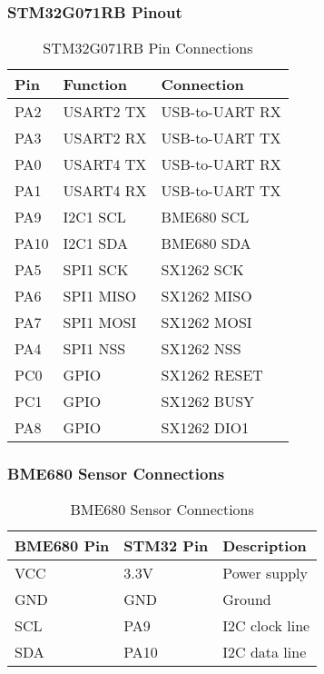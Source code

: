 \documentclass[11pt,a4paper]{article}
\begin{document}
\subsubsection{STM32G071RB Pinout}
\begin{table}[h]
\centering
\begin{tabular}{|l|l|l|}
\hline
\textbf{Pin} & \textbf{Function} & \textbf{Connection} \\
\hline
PA2 & USART2 TX & USB-to-UART RX \\
\hline
PA3 & USART2 RX & USB-to-UART TX \\
\hline
PA0 & USART4 TX & USB-to-UART RX \\
\hline
PA1 & USART4 RX & USB-to-UART TX \\
\hline
PA9 & I2C1 SCL & BME680 SCL \\
\hline
PA10 & I2C1 SDA & BME680 SDA \\
\hline
PA5 & SPI1 SCK & SX1262 SCK \\
\hline
PA6 & SPI1 MISO & SX1262 MISO \\
\hline
PA7 & SPI1 MOSI & SX1262 MOSI \\
\hline
PA4 & SPI1 NSS & SX1262 NSS \\
\hline
PC0 & GPIO & SX1262 RESET \\
\hline
PC1 & GPIO & SX1262 BUSY \\
\hline
PA8 & GPIO & SX1262 DIO1 \\
\hline
\end{tabular}
\caption{STM32G071RB Pin Connections}
\end{table}

\subsubsection{BME680 Sensor Connections}
\begin{table}[h]
\centering
\begin{tabular}{|l|l|l|}
\hline
\textbf{BME680 Pin} & \textbf{STM32 Pin} & \textbf{Description} \\
\hline
VCC & 3.3V & Power supply \\
\hline
GND & GND & Ground \\
\hline
SCL & PA9 & I2C clock line \\
\hline
SDA & PA10 & I2C data line \\
\hline
\end{tabular}
\caption{BME680 Sensor Connections}
\end{table}
\end{document}
